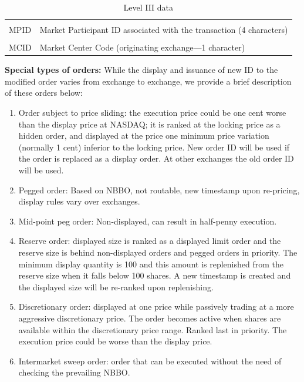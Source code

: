 \begin{table}[!ht]
\begin{tabular}{lp{}}
	& \\
	MPID & Market Participant ID associated with the transaction (4 characters) \\
	& \\
	MCID & Market Center Code (originating exchange---1 character) 
	\end{tabular}
	\caption{Level III data \label{tab:level3data}}
	\end{table}
	

\noindent\textbf{Special types of orders:} While the display and issuance of new ID to the modified order varies from exchange to exchange, we provide a brief description of these orders below:

\begin{enumerate}[1.]
\item Order subject to price sliding: the execution price could be one cent worse than the display price at NASDAQ; it is ranked at the locking price as a hidden order, and displayed at the price one minimum price variation (normally 1 cent) inferior to the locking price. New order ID will be used if the order is replaced as a display order. At other exchanges the old order ID will be used.

\item Pegged order: Based on NBBO, not routable, new timestamp upon re-pricing, display rules vary over exchanges.

\item Mid-point peg order: Non-displayed, can result in half-penny execution.

\item Reserve order: displayed size is ranked as a displayed limit order and the reserve size is behind non-displayed orders and pegged orders in priority. The minimum display quantity is 100 and this amount is replenished from the reserve size when it falls below 100 shares. A new timestamp is created and the displayed size will be re-ranked upon replenishing.

\item Discretionary order: displayed at one price while passively trading at a more aggressive discretionary price. The order becomes active when shares are available within the discretionary price range. Ranked last in priority. The execution price could be worse than the display price.

\item Intermarket sweep order: order that can be executed without the need of checking the prevailing NBBO.  
\end{enumerate}


